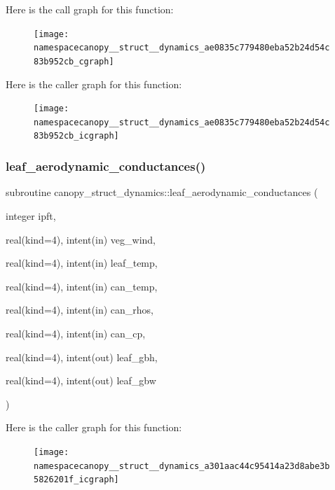 Here is the call graph for this function\+:
\nopagebreak
\begin{figure}[H]
\begin{center}
\leavevmode
\texttt{[image: namespacecanopy\_\_struct\_\_dynamics\_ae0835c779480eba52b24d54c83b952cb\_cgraph]}
\end{center}
\end{figure}
Here is the caller graph for this function\+:
\nopagebreak
\begin{figure}[H]
\begin{center}
\leavevmode
\texttt{[image: namespacecanopy\_\_struct\_\_dynamics\_ae0835c779480eba52b24d54c83b952cb\_icgraph]}
\end{center}
\end{figure}
\mbox{\label{namespacecanopy__struct__dynamics_a301aac44c95414a23d8abe3b5826201f}} 
\subsubsection{\texorpdfstring{leaf\+\_\+aerodynamic\+\_\+conductances()}{leaf\_aerodynamic\_conductances()}}
{\footnotesize\ttfamily subroutine canopy\+\_\+struct\+\_\+dynamics\+::leaf\+\_\+aerodynamic\+\_\+conductances (\begin{DoxyParamCaption}\item[{integer}]{ipft,  }\item[{real(kind=4), intent(in)}]{veg\+\_\+wind,  }\item[{real(kind=4), intent(in)}]{leaf\+\_\+temp,  }\item[{real(kind=4), intent(in)}]{can\+\_\+temp,  }\item[{real(kind=4), intent(in)}]{can\+\_\+rhos,  }\item[{real(kind=4), intent(in)}]{can\+\_\+cp,  }\item[{real(kind=4), intent(out)}]{leaf\+\_\+gbh,  }\item[{real(kind=4), intent(out)}]{leaf\+\_\+gbw }\end{DoxyParamCaption})}

Here is the caller graph for this function\+:
\nopagebreak
\begin{figure}[H]
\begin{center}
\leavevmode
\texttt{[image: namespacecanopy\_\_struct\_\_dynamics\_a301aac44c95414a23d8abe3b5826201f\_icgraph]}
\end{center}
\end{figure}
\mbox{\label{namespacecanopy__struct__dynamics_a603f1234645bf9624c578131440e8555}} 
